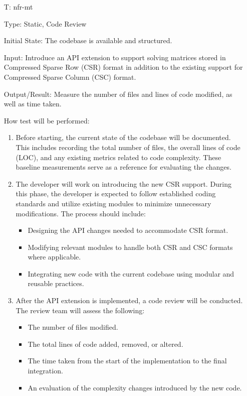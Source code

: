 \documentclass[12pt, titlepage]{article}
\newcounter{testnum} %
\begin{document}
\begin{itemize}

\item[T\refstepcounter{testnum}\thetestnum \label{T:mt}:]{nfr-mt}

Type: Static, Code Review

Initial State: The codebase is available and structured.

Input: Introduce an API extension to support solving matrices stored in
Compressed Sparse Row (CSR) format in addition to the existing support for
Compressed Sparse Column (CSC) format.

Output/Result: Measure the number of files and lines of code modified, as well
as time taken.

How test will be performed:

\begin{enumerate}
\item Before starting, the current state of the codebase will be documented. This
  includes recording the total number of files, the overall lines of code (LOC),
  and any existing metrics related to code complexity. These baseline
  measurements serve as a reference for evaluating the changes.
\item The developer will work on introducing the new CSR support. During this
  phase, the developer is expected to follow established coding standards and
  utilize existing modules to minimize unnecessary modifications. The process
  should include:
  \begin{itemize}
  \item Designing the API changes needed to accommodate CSR format.
  \item Modifying relevant modules to handle both CSR and CSC formats where
    applicable.
  \item Integrating new code with the current codebase using modular and reusable
    practices.
  \end{itemize}
\item After the API extension is implemented, a code review will be conducted. The
  review team will assess the following:
  \begin{itemize}
  \item The number of files modified.
  \item The total lines of code added, removed, or altered.
  \item The time taken from the start of the implementation to the final
    integration.
  \item An evaluation of the complexity changes introduced by the new code.

\end{itemize}
\end{enumerate}
\end{itemize}
\end{document}
